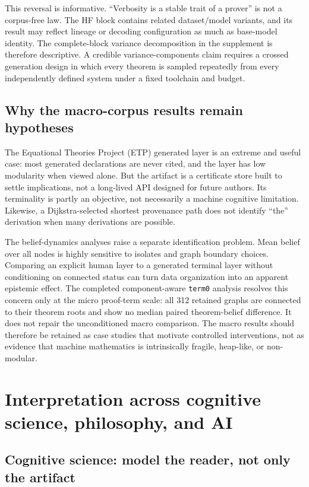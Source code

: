\documentclass[11pt]{article}
\newcommand{\code}[1]{\texttt{#1}}
\begin{document}
This reversal is informative.  ``Verbosity is a stable trait of a prover'' is not a corpus-free
law.  The HF block contains related dataset/model variants, and its result may reflect lineage or
decoding configuration as much as base-model identity.  The complete-block variance decomposition
in the supplement is therefore descriptive.  A credible variance-components claim requires a
crossed generation design in which every theorem is sampled repeatedly from every independently
defined system under a fixed toolchain and budget.

\subsection{Why the macro-corpus results remain hypotheses}

The Equational Theories Project (ETP) generated layer is an extreme and useful case: most generated
declarations are never cited, and the layer has low modularity when viewed alone.  But the artifact
is a certificate store built to settle implications, not a long-lived API designed for future
authors.  Its terminality is partly an objective, not necessarily a machine cognitive limitation.
Likewise, a Dijkstra-selected shortest provenance path does not identify ``the'' derivation when
many derivations are possible.

The belief-dynamics analyses raise a separate identification problem.  Mean belief over all nodes
is highly sensitive to isolates and graph boundary choices.  Comparing an explicit human layer to
a generated terminal layer without conditioning on connected status can turn data organization
into an apparent epistemic effect.  The completed component-aware \code{term0} analysis resolves
this concern only at the micro proof-term scale: all 312 retained graphs are connected to their
theorem roots and show no median paired theorem-belief difference.  It does not repair the
unconditioned macro comparison.  The macro results should therefore be retained as case studies
that motivate controlled interventions, not as evidence that machine mathematics is intrinsically
fragile, heap-like, or non-modular.

\section{Interpretation across cognitive science, philosophy, and AI}

\subsection{Cognitive science: model the reader, not only the artifact}
\end{document}
